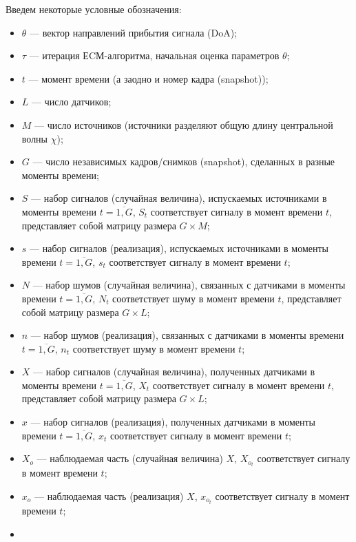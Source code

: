 \documentclass[11pt]{article}
\begin{document}
\begin{center}
\fontsize{20}{23}\selectfont {}
\end{center}
Введем некоторые условные обозначения:
\begin{itemize}
\item
$\theta$ --- вектор направлений прибытия сигнала (DoA);
\item
$\tau$ --- итерация ЕCМ-алгоритма, начальная оценка параметров $\theta$;
\item
$t$ --- момент времени (а заодно и номер кадра (snapshot));
\item
$L$ --- число датчиков;
\item
$M$ --- число источников (источники разделяют общую длину центральной волны $\chi$);
\item
$G$ --- число независимых кадров/снимков (snapshot), сделанных в разные моменты времени;
\item
$S$ --- набор сигналов (случайная величина), испускаемых источниками в моменты времени $t=\overline{1,G}$, $S_t$ соответствует сигналу в момент времени $t$, представляет собой матрицу размера $G \times M$;
\item
$s$ --- набор сигналов (реализация), испускаемых источниками в моменты времени $t=\overline{1,G}$, $s_t$ соответствует сигналу в момент времени $t$;
\item
$N$ --- набор шумов (случайная величина), связанных с датчиками в моменты времени $t=\overline{1,G}$, $N_t$ соответствует шуму в момент времени $t$, представляет собой матрицу размера $G \times L$;
\item
$n$ --- набор шумов (реализация), связанных с датчиками в моменты времени $t=\overline{1,G}$, $n_t$ соответствует шуму в момент времени $t$;
\item
$X$ --- набор сигналов (случайная величина), полученных датчиками в моменты времени $t=\overline{1,G}$, $X_t$ соответствует сигналу в момент времени $t$, представляет собой матрицу размера $G \times L$;
\item
$x$ --- набор сигналов (реализация), полученных датчиками в моменты времени $t=\overline{1,G}$, $x_t$ соответствует сигналу в момент времени $t$;
\item
$X_o$ --- наблюдаемая часть (случайная величина) $X$, $X_{o_t}$ соответствует сигналу в момент времени $t$; 
\item
$x_o$ --- наблюдаемая часть (реализация) $X$, $x_{o_t}$ соответствует сигналу в момент времени $t$;
\item

\end{itemize}
\end{document}
